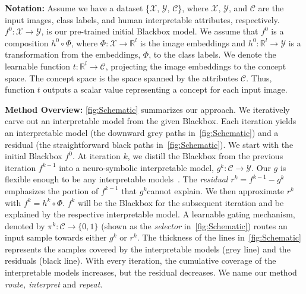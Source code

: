 

\textbf{Notation:} 
Assume we have a dataset \{$\mathcal{X}$, $\mathcal{Y}$, $\mathcal{C}$\}, where $\mathcal{X}$, $\mathcal{Y}$, and $\mathcal{C}$ are the input images, class labels, and human interpretable attributes, respectively. $\displaystyle f^0:  \mathcal{X} \rightarrow \mathcal{Y}$, is our pre-trained initial Blackbox model. We assume that $\displaystyle f^0$ is a composition $\displaystyle h^0 \circ \Phi $, where $\displaystyle \Phi: \mathcal{X} \rightarrow \mathbb{R}^l $ is the  image embeddings and $\displaystyle h^0: \mathbb{R}^l \rightarrow \mathcal{Y}$ is a transformation from the embeddings, $\Phi$, to the class labels. We denote the learnable function $\displaystyle t: \mathbb{R}^l \rightarrow\mathcal{C}$, projecting the image embeddings to the concept space.
The concept space is the space spanned by the attributes $\mathcal{C}$. Thus, function $t$ outputs a scalar value representing a concept for each input image. 

\textbf{Method Overview:} 
\cref{fig:Schematic} summarizes our approach. We iteratively carve out an interpretable model from the given Blackbox. Each iteration yields an interpretable model (the downward grey paths in~\cref{fig:Schematic}) and a residual (the straightforward black paths in~\cref{fig:Schematic}).
We start with the initial Blackbox $f^0$.
At iteration $k$, we distill the Blackbox from the previous iteration $f^{k-1}$ into a neuro-symbolic interpretable model, $\displaystyle g^{k}: \mathcal{C} \rightarrow \mathcal{Y}$. Our $g$ is flexible enough to be any interpretable models~\cite{yuksekgonul2022post, koh2020concept, barbiero2022entropy}. The \emph{residual} $r^k =f^{k-1} - g^k$ emphasizes the portion of $f^{k-1}$ that $g^k$cannot explain. We then approximate $r^k$ with $f^{k} = h^k \circ \Phi$. $f^k$ will be the Blackbox for the subsequent iteration and be explained by the respective interpretable model. 
A learnable gating mechanism, denoted by $\pi^k : \mathcal{C} \rightarrow \{0,1\}$ (shown as the \emph{selector} in~\cref{fig:Schematic}) routes an input sample towards either $g^k$ or $r^k$.
The thickness of the lines in~\cref{fig:Schematic} represents the samples covered by the interpretable models (grey line) and the residuals (black line). 
With every iteration, the cumulative coverage of the interpretable models increases, but the residual decreases. We name our method \emph{route, interpret} and \emph{repeat}.

